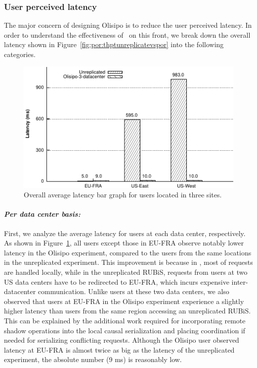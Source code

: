 \subsubsection{User perceived latency}
The major concern of designing Olisipo is to reduce the user perceived latency. In order
to understand the effectiveness of \coordtool\ on this front, we break down the overall latency shown in Figure~\ref{fig:por:thptunreplicatevspor}
into the following categories.
\begin{figure}[t!]
  \centering
\includegraphics[width=0.85\columnwidth]{figures/por/eval/avg_latency_unreplicated_vs_por.pdf}
  \caption{Overall average latency bar graph for users located in three sites.}
 \label{fig:por:avglatenunreplicatevspor}
\end{figure}
\paragraph{{\em Per data center basis:}} First, we analyze the average latency
for users at each data center, respectively. As shown in Figure~\ref{fig:por:avglatenunreplicatevspor},
all users except those in EU-FRA observe notably lower latency in the Olisipo experiment, compared
to the users from the same locations in the unreplicated experiment. This improvement is because in \coordtool, most of
requests are handled locally, while in the unreplicated RUBiS, requests from users at
two US data centers have to be redirected to EU-FRA, which incurs expensive inter-datacenter communication. Unlike users at these two data centers, we also
observed that users at EU-FRA in the Olisipo experiment experience a slightly higher latency than users
from the same region accessing an unreplicated RUBiS. This can be explained by the additional work required
for incorporating remote shadow operations into the local causal serialization and placing coordination if needed for
serializing conflicting requests. Although the Olisipo user observed latency at EU-FRA is almost twice as
big as the latency of the unreplicated experiment, the absolute number (9 ms) is reasonably low.

